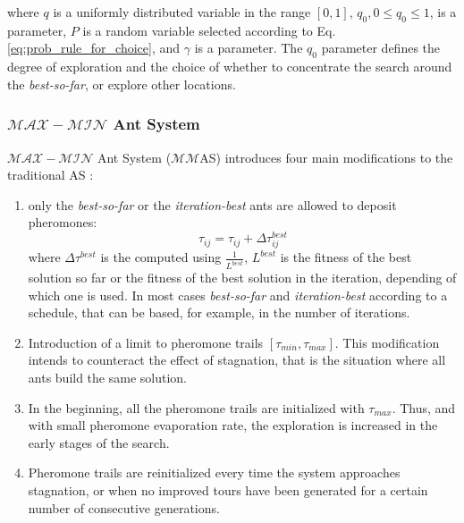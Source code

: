 					\noindent where $q$ is a uniformly distributed variable in the range $[0,1]$, $q_{0}, 0 \leq q_{0} \leq 1$, is a parameter, $P$ is a random variable selected according to Eq. \eqref{eq:prob_rule_for_choice}, and $\gamma$ is a parameter. The $q_{0}$ parameter defines the degree of exploration and the choice of whether to concentrate the search around the \emph{best-so-far}, or explore other locations.


					\subsubsection*{$\mathcal{MAX}-\mathcal{MIN}$ Ant System}
					$\mathcal{MAX}-\mathcal{MIN}$ Ant System ($\mathcal{MM}$AS) introduces four main modifications to the traditional AS \cite{stutzle00}:
					\begin{enumerate}
						\item only the \emph{best-so-far} or the \emph{iteration-best} ants are allowed to deposit pheromones:
							\begin{equation}
								\label{eq:max_min_rank_pheromone_update}
								\tau_{ij} = \tau_{ij} + \Delta\tau_{ij}^{best}
							\end{equation}
							\noindent where $\Delta\tau^{best}$ is the computed using $\frac{1} {L^{best}}$, ${L^{best}}$ is the fitness of the best solution so far or the fitness of the best solution in the iteration, depending of which one is used. In most cases \emph{best-so-far} and \emph{iteration-best} according to a schedule, that can be based, for example, in the number of iterations.
						
						\item Introduction of a limit to pheromone trails $[\tau_{min},\tau_{max}]$. This modification intends to counteract the effect of stagnation, that is the situation where all ants build the same solution.
						
						\item In the beginning, all the pheromone trails are initialized with $\tau_{max}$. Thus, and with small pheromone evaporation rate, the exploration is increased in the early stages of the search.
						
						\item Pheromone trails are reinitialized every time the system approaches stagnation, or when no improved tours have been generated for a certain number of consecutive generations.
						 					
					\end{enumerate}
		
